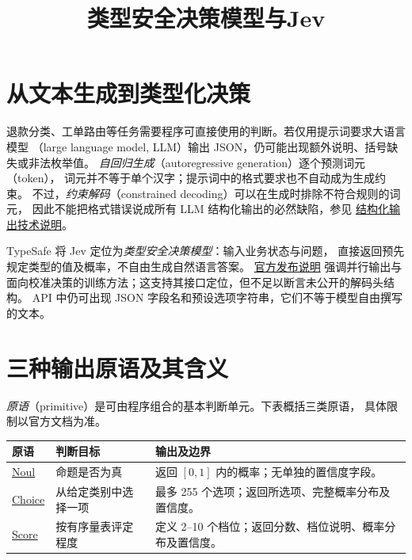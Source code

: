 \documentclass[UTF8,12pt,a4paper,fontset=fandol]{ctexart}
\title{类型安全决策模型与Jev}
\author{}
\date{}
\begin{document}
\maketitle

\section{从文本生成到类型化决策}
\label{sec:jev-motivation}

退款分类、工单路由等任务需要程序可直接使用的判断。若仅用提示词要求大语言模型
（large language model, LLM）输出 JSON，仍可能出现额外说明、括号缺失或非法枚举值。
\emph{自回归生成}（autoregressive generation）逐个预测词元（token），
词元并不等于单个汉字；提示词中的格式要求也不自动成为生成约束。
不过，\emph{约束解码}（constrained decoding）可以在生成时排除不符合规则的词元，
因此不能把格式错误说成所有 LLM 结构化输出的必然缺陷，参见
\href{https://openai.com/index/introducing-structured-outputs-in-the-api/}{结构化输出技术说明}。

TypeSafe 将 Jev 定位为\emph{类型安全决策模型}：输入业务状态与问题，
直接返回预先规定类型的值及概率，不自由生成自然语言答案。
\href{https://typesafe.ai/blog/introducing-system-one-models-and-jev}{官方发布说明}
强调并行输出与面向校准决策的训练方法；这支持其接口定位，但不足以断言未公开的解码头结构。
API 中仍可出现 JSON 字段名和预设选项字符串，它们不等于模型自由撰写的文本。

\section{三种输出原语及其含义}
\label{sec:jev-primitives}

\emph{原语}（primitive）是可由程序组合的基本判断单元。下表概括三类原语，
具体限制以官方文档为准。

\begin{center}
\begin{tabularx}{\textwidth}{@{}lYY@{}}
\toprule
原语 & 判断目标 & 输出及边界 \\
\midrule
\href{https://docs.typesafe.ai/primitives/noul}{Noul}
& 命题是否为真 & 返回 $[0,1]$ 内的概率；无单独的置信度字段。 \\
\href{https://docs.typesafe.ai/primitives/choice}{Choice}
& 从给定类别中选择一项 & 最多 255 个选项；返回所选项、完整概率分布及置信度。 \\
\href{https://docs.typesafe.ai/primitives/score}{Score}
& 按有序量表评定程度 & 定义 2--10 个档位；返回分数、档位说明、概率分布及置信度。 \\
\bottomrule
\end{tabularx}
\end{center}
\end{document}
